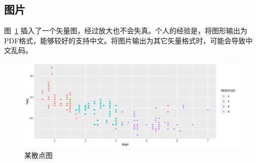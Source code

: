 \documentclass[zihao = -4, linespread = 1.5]{ctexart} %
\begin{document}
\subsection{图片}
图~\ref{fig:scatter} 插入了一个矢量图，经过放大也不会失真。个人的经验是，将图形输出为PDF格式，能够较好的支持中文。将图片输出为其它矢量格式时，可能会导致中文乱码。
\begin{figure}[htpb]
  \centering
  \includegraphics[width=\textwidth]{picture/scatter.pdf}
  \caption{某散点图  \protect\footnotemark} %
  \label{fig:scatter}
\end{figure}

\end{document}
